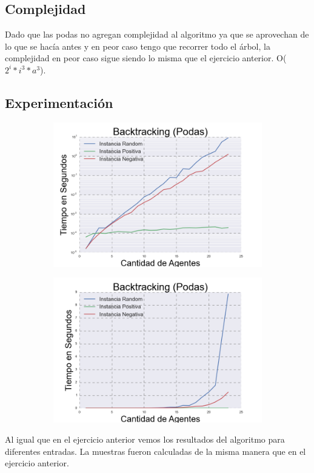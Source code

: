 \subsection{Complejidad}

	Dado que las podas no agregan complejidad al algoritmo ya que se aprovechan de lo que se hacía antes y en peor caso tengo que recorrer todo el árbol, la complejidad en peor caso sigue siendo lo misma que el ejercicio anterior. O($2^{i}*i^{3}*a^{3}$). 
	
\subsection{Experimentación}

\begin{figure}[h]

\begin{subfigure}{0.5\textwidth}
\includegraphics[scale=0.45]{PodasLog.png}
\end{subfigure}
\begin{subfigure}{0.5\textwidth}
\includegraphics[scale=0.45]{Podas.png}
\end{subfigure}

\end{figure}

	Al igual que en el ejercicio anterior vemos los resultados del algoritmo para diferentes entradas. La muestras fueron calculadas de la misma manera que en el ejercicio anterior.